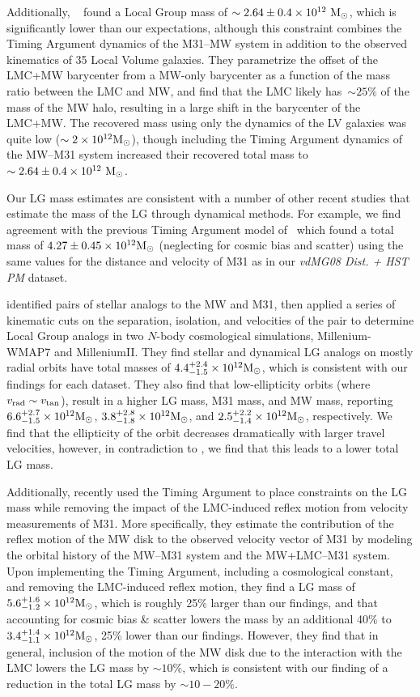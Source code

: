 \documentclass[twocolumn]{aastex631}
\begin{document}
Additionally, ~\cite{Penarrubia2016} found a Local Group mass of
$\sim2.64\pm0.4\times 10^{12}~\mathrm{M}_\odot$, which is significantly lower than our
expectations, although this constraint combines the Timing Argument dynamics of
the M31--MW system in addition to the observed kinematics of 35 Local Volume
galaxies. They parametrize the offset of the LMC+MW barycenter from a
MW-only barycenter as a function of the mass ratio between the LMC and MW, and
find that the LMC likely has~$\sim25\%$ of the mass of the MW halo, resulting in
a large shift in the barycenter of the LMC+MW.
The recovered mass using only the dynamics of the LV galaxies was quite low
($\sim 2\times 10^{12}\mathrm{M}_\odot$), though
including the Timing Argument dynamics of the MW--M31 system increased their
recovered total mass to $\sim2.64\pm0.4\times 10^{12}~\mathrm{M}_\odot$.

Our LG mass estimates are consistent with a number of other recent
studies that estimate the mass of the LG through dynamical methods.
For example, we find agreement with the previous Timing Argument model
of~\cite{vdm2012} which found a total mass
of $4.27\pm0.45\times 10^{12}\mathrm{M}_\odot$ (neglecting for cosmic bias and
scatter) using the same values for the distance and velocity of
M31 as in our \textit{vdMG08 Dist. + HST PM} dataset.

\cite{Zhai2020} identified pairs of stellar analogs to the MW and M31, then
applied a series of kinematic cuts on the separation, isolation, and velocities
of the pair to determine Local Group analogs in two $N$-body cosmological
simulations, Millenium-WMAP7 and MilleniumII.
They find stellar and dynamical LG analogs on mostly radial orbits have total
masses of $4.4^{+2.4}_{-1.5}\times 10^{12}\mathrm{M}_\odot$, which is consistent with our
findings for each dataset.
They also find that low-ellipticity orbits (where
$v_{\rm rad}\sim v_{\rm tan}$), result in a higher LG mass, M31 mass, and MW
mass, reporting $6.6^{+2.7}_{-1.5}\times10^{12}\mathrm{M}_\odot$,
$3.8^{+2.8}_{-1.8}\times10^{12}\mathrm{M}_\odot$, and
$2.5^{+2.2}_{-1.4}\times10^{12}\mathrm{M}_\odot$, respectively.
We find that the ellipticity of the orbit decreases dramatically with larger
travel velocities, however, in contradiction to \cite{Zhai2020}, we find that
this leads to a lower total LG mass.

Additionally, \cite{Benisty2022} recently used the Timing Argument to
place constraints on the LG mass while removing the impact of the LMC-induced
reflex motion from velocity measurements of M31.
More specifically, they estimate the contribution of the reflex motion of the
MW disk to the observed velocity vector of M31 by modeling the orbital history
of the MW--M31 system and the MW+LMC--M31 system.
Upon implementing the Timing Argument, including a cosmological constant,
and removing the LMC-induced reflex motion,
they find a LG mass of $5.6^{+1.6}_{-1.2}\times10^{12}\mathrm{M}_\odot$, which is roughly
25\% larger than our findings, and that accounting for cosmic bias \& scatter
lowers the mass by an additional 40\% to $3.4^{+1.4}_{-1.1}\times10^{12}\mathrm{M}_\odot$,
25\% lower than our findings.
However, they find that in general, inclusion of the motion of the MW disk due
to the interaction with the LMC lowers the LG mass by $\sim10\%$, which is
consistent with our finding of a reduction in the total LG mass by $\sim10-20\%$.
\end{document}

